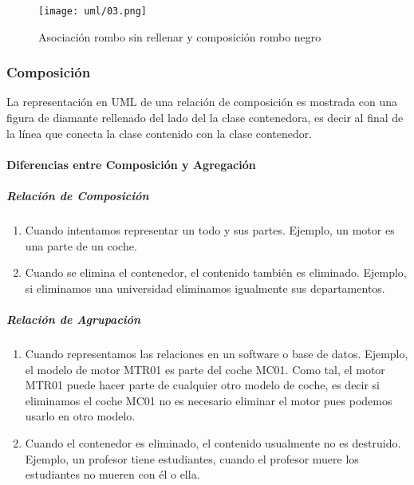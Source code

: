 \begin{figure}[h!t] 
    \centering
    \texttt{[image: uml/03.png]}
    \caption{Asociación rombo sin rellenar y composición rombo negro}
    \label{img:uml-composicion}
\end{figure}

\subsubsection*{Composición}

La representación en UML de una relación de composición es mostrada con una figura de diamante rellenado del lado del la clase contenedora, es decir al final de la línea que conecta la clase contenido con la clase contenedor.


\paragraph*{Diferencias entre Composición y Agregación}

\subparagraph*{Relación de Composición}

\begin{enumerate}
    \item Cuando intentamos representar un todo y sus partes. Ejemplo, un motor es una parte de un coche.
    \item Cuando se elimina el contenedor, el contenido también es eliminado. Ejemplo, si eliminamos una universidad eliminamos igualmente sus departamentos.
\end{enumerate}


\subparagraph*{Relación de Agrupación}

\begin{enumerate}
    \item Cuando representamos las relaciones en un software o base de datos. Ejemplo, el modelo de motor MTR01 es parte del coche MC01. Como tal, el motor MTR01 puede hacer parte de cualquier otro modelo de coche, es decir si eliminamos el coche MC01 no es necesario eliminar el motor pues podemos usarlo en otro modelo.
    \item Cuando el contenedor es eliminado, el contenido usualmente no es destruido. Ejemplo, un profesor tiene estudiantes, cuando el profesor muere los estudiantes no mueren con él o ella.
\end{enumerate}